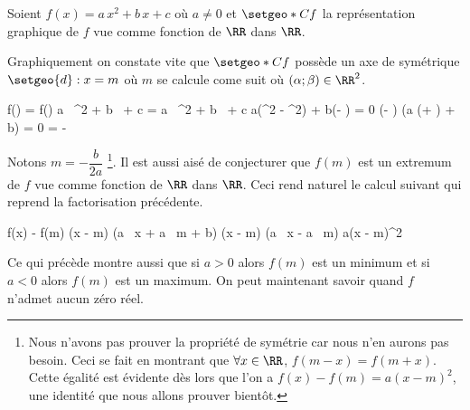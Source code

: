 Soient $f(x) = a \, x^2 + b \, x + c$ où $a \neq 0$ et $\setgeo*{C}{f}$ la représentation graphique de $f$ vue comme fonction de $\RR$ dans $\RR$.

\medskip

Graphiquement on constate vite que $\setgeo*{C}{f}$ possède un axe de symétrique $\setgeo{d}: x = m$ où $m$ se calcule come suit où $(\alpha ; \beta) \in \RR^2$.

\medskip

\begin{explain}[style = sar, ope = \iff] 
	f(\alpha) = f(\beta)
		\explnext{}
	a \, \alpha^2 + b \, \alpha + c = a \, \beta^2 + b \, \beta + c
		\explnext{}
	a(\alpha^2 - \beta^2) + b(\alpha - \beta) = 0
		\explnext{}
	(\alpha - \beta) (a (\alpha + \beta) + b) = 0
		\explnext{}
	 = - 
\end{explain}

\medskip

Notons $m = - \dfrac{b}{2a}$
\footnote{
	Nous n'avons pas prouver la propriété de symétrie car nous n'en aurons pas besoin.
	Ceci se fait en montrant que $\forall x \in \RR$, $f(m- x) = f(m + x)$.
	Cette égalité est évidente dès lors que l'on a $f(x) - f(m) = a(x - m)^2$, une identité que nous allons prouver bientôt.
}.
Il est aussi aisé de conjecturer que $f(m)$ est un extremum de $f$ vue comme fonction de $\RR$ dans $\RR$. Ceci rend naturel le calcul suivant qui reprend la factorisation précédente.

\medskip

\begin{explain}[style = sar] 
	f(x) - f(m)
		\explnext{}
	(x - m) (a \, x + a \, m + b)
	(x - m) (a \, x - a \, m)
		\explnext{}
	a(x - m)^2
\end{explain}

\medskip

Ce qui précède montre aussi que 
si $a > 0$ alors $f(m)$ est un minimum et
si $a < 0$ alors $f(m)$ est un maximum. On peut maintenant savoir quand $f$ n'admet aucun zéro réel.

